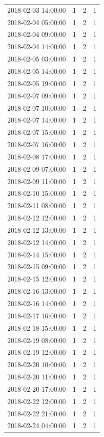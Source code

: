 \begin{tabular}{lrrr}
2018-02-03 14:00:00 & 1 & 2 & 1 \\
2018-02-04 05:00:00 & 1 & 2 & 1 \\
2018-02-04 09:00:00 & 1 & 2 & 1 \\
2018-02-04 14:00:00 & 1 & 2 & 1 \\
2018-02-05 03:00:00 & 1 & 2 & 1 \\
2018-02-05 14:00:00 & 1 & 2 & 1 \\
2018-02-05 19:00:00 & 1 & 2 & 1 \\
2018-02-07 09:00:00 & 1 & 2 & 1 \\
2018-02-07 10:00:00 & 1 & 2 & 1 \\
2018-02-07 14:00:00 & 1 & 2 & 1 \\
2018-02-07 15:00:00 & 1 & 2 & 1 \\
2018-02-07 16:00:00 & 1 & 2 & 1 \\
2018-02-08 17:00:00 & 1 & 2 & 1 \\
2018-02-09 07:00:00 & 1 & 2 & 1 \\
2018-02-09 11:00:00 & 1 & 2 & 1 \\
2018-02-10 15:00:00 & 1 & 2 & 1 \\
2018-02-11 08:00:00 & 1 & 2 & 1 \\
2018-02-12 12:00:00 & 1 & 2 & 1 \\
2018-02-12 13:00:00 & 1 & 2 & 1 \\
2018-02-12 14:00:00 & 1 & 2 & 1 \\
2018-02-14 15:00:00 & 1 & 2 & 1 \\
2018-02-15 09:00:00 & 1 & 2 & 1 \\
2018-02-15 12:00:00 & 1 & 2 & 1 \\
2018-02-16 13:00:00 & 1 & 2 & 1 \\
2018-02-16 14:00:00 & 1 & 2 & 1 \\
2018-02-17 16:00:00 & 1 & 2 & 1 \\
2018-02-18 15:00:00 & 1 & 2 & 1 \\
2018-02-19 08:00:00 & 1 & 2 & 1 \\
2018-02-19 12:00:00 & 1 & 2 & 1 \\
2018-02-20 10:00:00 & 1 & 2 & 1 \\
2018-02-20 11:00:00 & 1 & 2 & 1 \\
2018-02-20 17:00:00 & 1 & 2 & 1 \\
2018-02-22 12:00:00 & 1 & 2 & 1 \\
2018-02-22 21:00:00 & 1 & 2 & 1 \\
2018-02-24 04:00:00 & 1 & 2 & 1 \\

\end{tabular}
